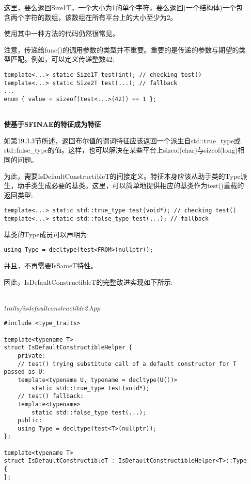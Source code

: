 这里，要么返回Size1T，一个大小为1的单个字符，要么返回(一个结构体)一个包含两个字符的数组，该数组在所有平台上的大小至少为2。

使用其中一种方法的代码仍然很常见。

注意，传递给func()的调用参数的类型并不重要。重要的是传递的参数与期望的类型匹配。例如，可以定义传递整数42:

\begin{lstlisting}[style=styleCXX]
template<...> static Size1T test(int); // checking test()
template<...> static Size2T test(...); // fallback
...
enum { value = sizeof(test<...>(42)) == 1 };
\end{lstlisting}

\hspace*{\fill} \\ %
\noindent
\textbf{使基于SFINAE的特征成为特征}

如第19.3.3节所述，返回布尔值的谓词特征应该返回一个派生自std::true\_type或std::false\_type的值。这样，也可以解决在某些平台上sizeof(char)与sizeof(long)相同的问题。

为此，需要IsDefaultConstructibleT的间接定义。特征本身应该从助手类的Type派生，助手类生成必要的基类。这里，可以简单地提供相应的基类作为test()重载的返回类型:

\begin{lstlisting}[style=styleCXX]
template<...> static std::true_type test(void*); // checking test()
template<...> static std::false_type test(...); // fallback
\end{lstlisting}

基类的Type成员可以声明为:

\begin{lstlisting}[style=styleCXX]
using Type = decltype(test<FROM>(nullptr));
\end{lstlisting}

并且，不再需要IsSameT特性。

因此，IsDefaultConstructibleT的完整改进实现如下所示:

\hspace*{\fill} \\ %
\noindent
\textit{traits/isdefaultconstructible2.hpp}
\begin{lstlisting}[style=styleCXX]
#include <type_traits>

template<typename T>
struct IsDefaultConstructibleHelper {
	private:
	// test() trying substitute call of a default constructor for T passed as U:
	template<typename U, typename = decltype(U())>
		static std::true_type test(void*);
	// test() fallback:
	template<typename>
		static std::false_type test(...);
	public:
	using Type = decltype(test<T>(nullptr));
};

template<typename T>
struct IsDefaultConstructibleT : IsDefaultConstructibleHelper<T>::Type {
};
\end{lstlisting}

